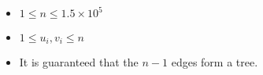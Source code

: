 \begin{itemize}
\tightlist
\item $1 \leq n \leq 1.5 \times 10^5$
\item $1 \leq u_i, v_i \leq n$
\item It is guaranteed that the $n-1$ edges form a tree.
\end{itemize}
\newpage
